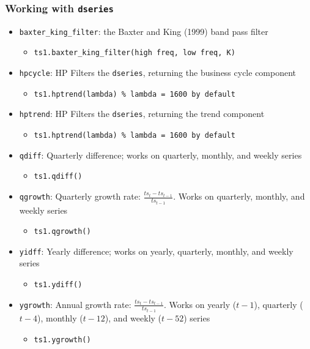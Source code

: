 \documentclass[10pt]{beamer}
\begin{document}
\begin{frame}[fragile,t]
  \frametitle{Working with \texttt{dseries}}
  \begin{itemize}
  \item \texttt{baxter\_king\_filter}: the Baxter and King (1999) band pass filter
    \begin{itemize}
    \item \texttt{ts1.baxter\_king\_filter(high freq, low freq, K)}
    \end{itemize}
  \item \texttt{hpcycle}: HP Filters the \texttt{dseries}, returning the business cycle component
    \begin{itemize}
    \item \texttt{ts1.hptrend(lambda) \% lambda = 1600 by default}
    \end{itemize}
  \item \texttt{hptrend}: HP Filters the \texttt{dseries}, returning the trend component
    \begin{itemize}
    \item \texttt{ts1.hptrend(lambda) \% lambda = 1600 by default}
    \end{itemize}
  \item \texttt{qdiff}: Quarterly difference; works on quarterly, monthly, and weekly series
    \begin{itemize}
    \item \texttt{ts1.qdiff()}
    \end{itemize}
  \item \texttt{qgrowth}: Quarterly growth rate: $\frac{ts_t-ts_{t-1}}{ts_{t-1}}$. Works on quarterly, monthly, and weekly series
    \begin{itemize}
    \item \texttt{ts1.qgrowth()}
    \end{itemize}
  \item \texttt{yidff}: Yearly difference; works on yearly, quarterly, monthly, and weekly series
    \begin{itemize}
    \item \texttt{ts1.ydiff()}
    \end{itemize}
  \item \texttt{ygrowth}: Annual growth rate: $\frac{ts_t-ts_{t-1}}{ts_{t-1}}$. Works on yearly ($t-1$), quarterly ($t-4$), monthly ($t-12$), and weekly ($t-52$) series
    \begin{itemize}
    \item \texttt{ts1.ygrowth()}
    \end{itemize}
  \end{itemize}
\end{frame}
\end{document}

